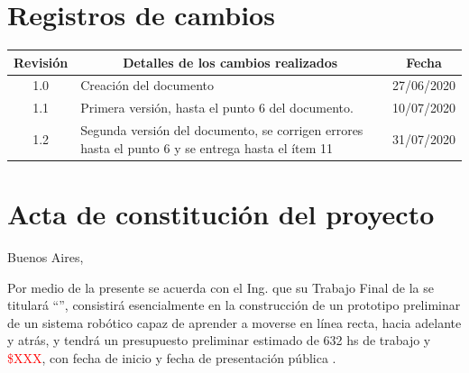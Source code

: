 \documentclass[11pt]{charter}
\begin{document}
\maketitle
\thispagestyle{empty}
\pagebreak


\thispagestyle{empty}
{\setlength{\parskip}{0pt}
\tableofcontents{}
}
\pagebreak


\section{Registros de cambios}
\label{sec:registro}


\begin{table}[ht]
\label{tab:registro}
\centering
\begin{tabularx}{\linewidth}{@{}|c|X|c|@{}}
\hline
\rowcolor[HTML]{C0C0C0} 
Revisión & \multicolumn{1}{c|}{\cellcolor[HTML]{C0C0C0}Detalles de los cambios realizados} & Fecha \\ 
\hline 1.0      & Creación del documento                                          & 27/06/2020 \\
\hline 1.1 & Primera versión, hasta el punto 6 del documento.                                            & 10/07/2020 \\
\hline 1.2 & Segunda versión del documento, se corrigen errores hasta el punto 6 y se entrega hasta el ítem 11 & 31/07/2020 \\ 
\hline
\end{tabularx}
\end{table}

\pagebreak



\section{Acta de constitución del proyecto}
\label{sec:acta}

\begin{flushright}
Buenos Aires, \fechaInicioName
\end{flushright}

\vspace{2cm}

Por medio de la presente se acuerda con el Ing. \authorname\hspace{1px} que su Trabajo Final de la \degreename\hspace{1px} se titulará ``\ttitle'', consistirá esencialmente en la construcción de un prototipo preliminar de un sistema robótico capaz de aprender a moverse en línea recta, hacia adelante y atrás, y tendrá un presupuesto preliminar estimado de 632 hs de trabajo y \textcolor{red}{\$XXX}, con fecha de inicio \fechaInicioName\hspace{1px} y fecha de presentación pública \fechaFinalName.
\end{document}
